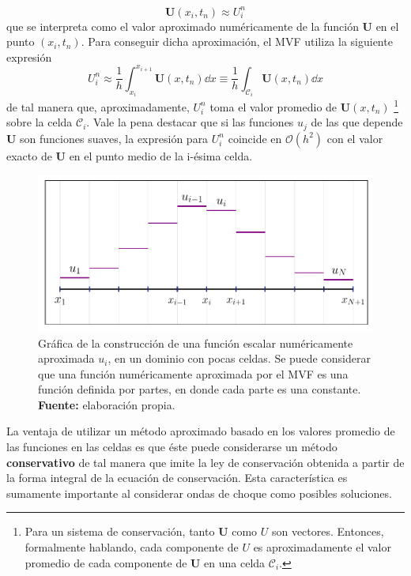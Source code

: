 \begin{equation}
	\mathbf{U}(x_i, t_n) \approx U_{i}^{n}
\end{equation}
que se interpreta como el valor aproximado numéricamente de la función $\mathbf{U}$ en el punto $(x_i, t_n)$. Para conseguir dicha aproximación, el MVF utiliza la siguiente expresión
\begin{equation}
	U_{i}^{n} \approx \frac{1}{h}\int_{x_i}^{x_{i+1}}\mathbf{U}(x, t_n)\dd{x} \equiv \frac{1}{h}\int_{\mathcal{C}_i}\mathbf{U}(x, t_n)\dd{x}
\end{equation}
de tal manera que, aproximadamente, $U_i^n$ toma el valor promedio de $\mathbf{U}(x,t_n)$ \footnote{Para un sistema de conservación, tanto $\mathbf{U}$ como $U$ son vectores. Entonces, formalmente hablando, cada componente de $U$ es aproximadamente el valor promedio de cada componente de $\mathbf{U}$ en una celda $\mathcal{C}_i$.} sobre la celda $\mathcal{C}_i$. Vale la pena destacar que si las funciones $u_j$ de las que depende $\mathbf{U}$ son funciones suaves, la expresión para $U_i^n$ coincide en $\mathcal{O}(h^2)$ con el valor exacto de $\mathbf{U}$ en el punto medio de la i-ésima celda.

\begin{figure}[ht]
	\centering
	\includegraphics[width=\linewidth]{../some_plots/cap2/graficas/numeric_U.pdf}
	\caption{Gráfica de la construcción de una función escalar numéricamente aproximada $u_i$, en un dominio con pocas celdas. Se puede considerar que una función numéricamente aproximada por el MVF es una función definida por partes, en donde cada parte es una constante. \textbf{Fuente:} elaboración propia.}
	\label{fig:discretizacion-de-U}
\end{figure}

La ventaja de utilizar un método aproximado basado en los valores promedio de las funciones en las celdas es que éste puede considerarse un método \textbf{conservativo} de tal manera que imite la ley de conservación obtenida a partir de la forma integral de la ecuación de conservación. Esta característica es sumamente importante al considerar ondas de choque como posibles soluciones.

